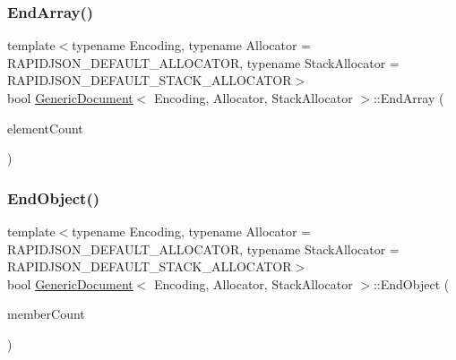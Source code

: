 \subsubsection{\texorpdfstring{End\+Array()}{EndArray()}}
{\footnotesize\ttfamily template$<$typename Encoding, typename Allocator = R\+A\+P\+I\+D\+J\+S\+O\+N\+\_\+\+D\+E\+F\+A\+U\+L\+T\+\_\+\+A\+L\+L\+O\+C\+A\+T\+OR, typename Stack\+Allocator = R\+A\+P\+I\+D\+J\+S\+O\+N\+\_\+\+D\+E\+F\+A\+U\+L\+T\+\_\+\+S\+T\+A\+C\+K\+\_\+\+A\+L\+L\+O\+C\+A\+T\+OR$>$ \\
bool \hyperlink{classGenericDocument}{Generic\+Document}$<$ Encoding, Allocator, Stack\+Allocator $>$\+::End\+Array (\begin{DoxyParamCaption}\item[{\hyperlink{rapidjson_8h_a5ed6e6e67250fadbd041127e6386dcb5}{Size\+Type}}]{element\+Count }\end{DoxyParamCaption})\hspace{0.3cm}{\ttfamily [inline]}}

\mbox{\label{classGenericDocument_a42f2df68f9c9d8b88a15b609716867d9}} 
\subsubsection{\texorpdfstring{End\+Object()}{EndObject()}}
{\footnotesize\ttfamily template$<$typename Encoding, typename Allocator = R\+A\+P\+I\+D\+J\+S\+O\+N\+\_\+\+D\+E\+F\+A\+U\+L\+T\+\_\+\+A\+L\+L\+O\+C\+A\+T\+OR, typename Stack\+Allocator = R\+A\+P\+I\+D\+J\+S\+O\+N\+\_\+\+D\+E\+F\+A\+U\+L\+T\+\_\+\+S\+T\+A\+C\+K\+\_\+\+A\+L\+L\+O\+C\+A\+T\+OR$>$ \\
bool \hyperlink{classGenericDocument}{Generic\+Document}$<$ Encoding, Allocator, Stack\+Allocator $>$\+::End\+Object (\begin{DoxyParamCaption}\item[{\hyperlink{rapidjson_8h_a5ed6e6e67250fadbd041127e6386dcb5}{Size\+Type}}]{member\+Count }\end{DoxyParamCaption})\hspace{0.3cm}{\ttfamily [inline]}}

\mbox{\label{classGenericDocument_aa4609d6b19f86aec1a6b96edf2c27686}} 
